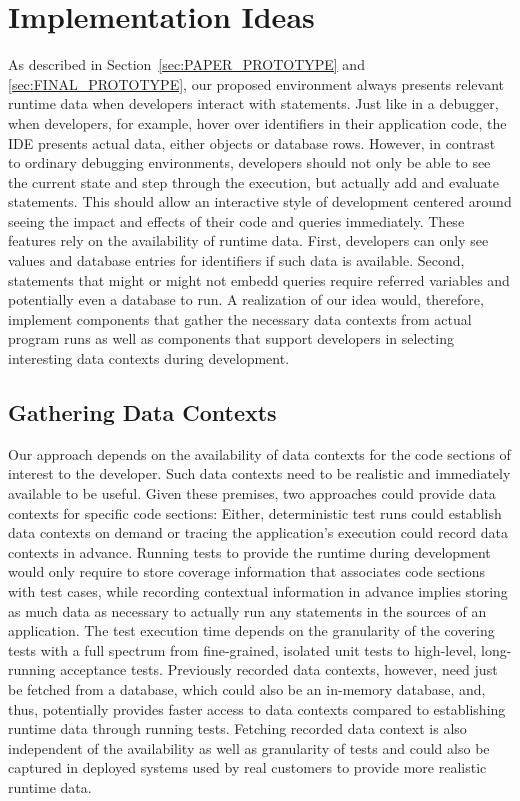 \section{Implementation Ideas} \label{sec:IMPLEMENTATION_IDEAS}
As described in Section~\ref{sec:PAPER_PROTOTYPE} and \ref{sec:FINAL_PROTOTYPE}, our proposed environment always presents relevant runtime data when developers interact with statements.
Just like in a debugger, when developers, for example, hover over identifiers in their application code, the IDE presents actual data, either objects or database rows.
However, in contrast to ordinary debugging environments, developers should not only be able to see the current state and step through the execution, but actually add and evaluate statements.
This should allow an interactive style of development centered around seeing the impact and effects of their code and queries immediately.
These features rely on the availability of runtime data.
First, developers can only see values and database entries for identifiers if such data is available.
Second, statements that might or might not embedd queries require referred variables and potentially even a database to run.
A realization of our idea would, therefore, implement components that gather the necessary data contexts from actual program runs as well as components that support developers in selecting interesting data contexts during development.

\subsection{Gathering Data Contexts}

Our approach depends on the availability of data contexts for the code sections of interest to the developer.
Such data contexts need to be realistic and immediately available to be useful.
Given these premises, two approaches could provide data contexts for specific code sections:
Either, deterministic test runs could establish data contexts on demand or tracing the application's execution could record data contexts in advance.
Running tests to provide the runtime during development would only require to store coverage information that associates code sections with test cases, while recording contextual information in advance implies storing as much data as necessary to actually run any statements in the sources of an application.
The test execution time depends on the granularity of the covering tests with a full spectrum from fine-grained, isolated unit tests to high-level, long-running acceptance tests.
Previously recorded data contexts, however, need just be fetched from a database, which could also be an in-memory database, and, thus, potentially provides faster access to data contexts compared to establishing runtime data through running tests.
Fetching recorded data context is also independent of the availability as well as granularity of tests and could also be captured in deployed systems used by real customers to provide more realistic runtime data.

